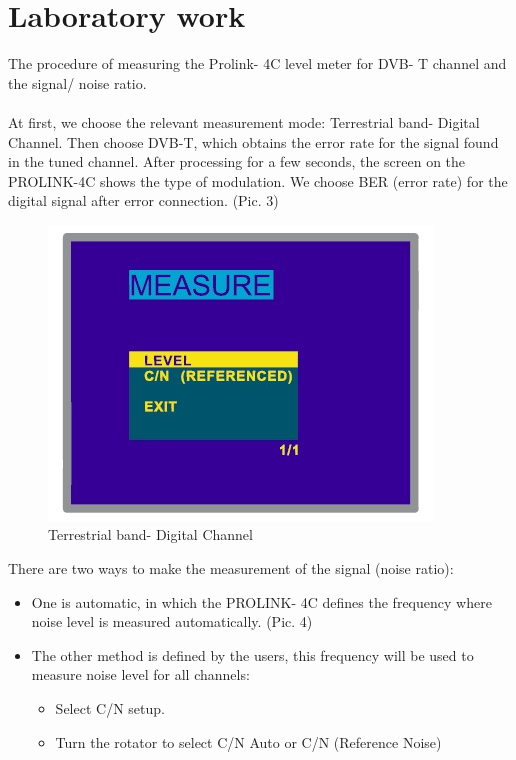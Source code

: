 \documentclass[english]{article}
\begin{document}
\section{Laboratory work}
The procedure of measuring the Prolink- 4C level meter for DVB- T channel and the signal/ noise ratio.\\\\
At first, we choose the relevant measurement mode: Terrestrial band- Digital Channel. Then choose DVB-T, which obtains the error rate for the signal found in the tuned channel. After processing for a few seconds, the screen on the PROLINK-4C shows the type of modulation. We choose BER (error rate) for the digital signal after error connection. (Pic. 3)
\begin{figure}
\centerline{\includegraphics[scale=1]{DTV/Pic3}}
\caption{Terrestrial band- Digital Channel}
\end{figure}
There are two ways to make the measurement of the signal (noise ratio):
\begin{itemize}
\item One is automatic, in which the PROLINK- 4C defines the frequency where noise level is measured automatically. (Pic. 4)
\item The other method is defined by the users, this frequency will be used to measure noise level for all channels:
\begin{itemize}
\item Select C/N setup.
\item Turn the rotator to select C/N Auto or C/N (Reference Noise)
\end{itemize}
\end{itemize}
\end{document}
